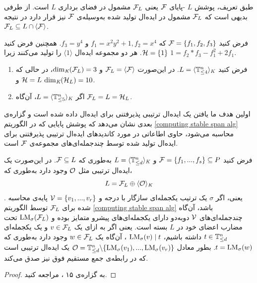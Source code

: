 \begin{corollary}
طبق تعریف، پوشش 
$L$
-پایای 
${\mathcal F}$
یعنی 
${\mathcal F}_{L}$
مشمول در فضای برداری 
$L$
است. از طرفی بدیهی است که 
${\mathcal F}_{L}$
مشمول در ایده‌ال تولید شده به‌وسیله‌ی 
${\mathcal F}$
نیز قرار دارد  در نتیجه 
${\mathcal F}_{L}\subseteq L\cap \langle {\mathcal F} \rangle$.
\end{corollary}

\begin{example}
فرض کنید 
${\mathcal F} = \{f_{1}, f_{2}, f_{3}\}$
که 
$f_{1} = x^{2}y^{2} + 1, f_{2} = x^{4}$
و
$f_{3} = y^{4}$.
همچنین فرض کنید 
${\mathcal H} = \{1\}$.
هر دو مجموعه‌ ایده‌ال 
$\langle 1\rangle$
را تولید می‌کنند زیرا 
$1 = f_{2}*f_{3} - f_{1}^{2} + 2f_{1}$.

\begin{enumerate}
\item
فرض کنید 
$L = \langle {\mathbb{T}}^{n}_{\leq 4}\rangle_{\textit{K}}$.
در این‌صورت 
${\mathcal F}_{L} = \langle {\mathcal F}\rangle$
و
$\dim_{\textit{K}}({\mathcal F}_{L}) = 3$،
در حالی که 
${\mathcal H} = L$
و 
$\dim_{\textit{K}}({\mathcal H}_{L}) = 10$.
\item
اگر 
$L = \langle {\mathbb{T}}^{n}_{\leq 5}\rangle_{\textit{K}}$،
آن‌گاه 
${\mathcal F}_{L} = L = {\mathcal H}_{L}$.
\end{enumerate}
\end{example}

اولین هدف ما یافتن یک ایده‌ال ترتیبی پذیرفتنی برای ایده‌ال داده شده است و گزاره‌ی بعدی نشان می‌دهد که پوشش پایایی که در الگوریتم 
\ref{computing stable span alg}
محاسبه می‌شود، حاوی اطاعاتی در مورد کاندید‌های ایده‌ال ترتیبی پذیرفتنی برای ایده‌ال تولید شده توسط چندجمله‌ای‌های  مجموعه‌ی 
${\mathcal F}$
است.

\begin{proposition}
فرض کنید 
${\mathcal F} = \{f_{1},...,f_{s}\}\subseteq P$
و
$L = \langle {\mathbb{T}}^{n}_{\leq d} \rangle_{\textit{K}}$
به‌طوری که 
${\mathcal F}\subseteq L$.
در این‌صورت یک ایده‌ال ترتیبی مثل 
${\mathcal O}$
وجود دارد به‌طوری که،
$$L = {\mathcal F}_{L}\oplus \langle {\mathcal O} \rangle_{\textit{K}}$$.
یعنی، اگر 
$\sigma$
یک ترتیب یکجمله‌ای سازگار با درجه  و 
${\mathcal V} = \{v_{1},...,v_{r}\}$
پایه‌ی محاسبه شده برای 
${\mathcal F}_{L}$
توسط الگوریتم 
\ref{computing stable span alg}
باشد، آن‌گاه چندجمله‌ای‌های 
${\mathcal V}$
دوبه‌دو دارای یکجمله‌ای‌های پیشرو متمایز بوده و 
$\operatorname{\mathrm{LM}}_{\sigma}({\mathcal F}_{L})$
تحت مضارب اعضای خود در 
$L$
بسته است. یعنی اگر به ازای یک 
$v\in {\mathcal F}_{L}$
و یک یکجمله‌ای 
$t\in {\mathbb{T}}^{n}_{\leq d}$
داشته باشیم، 
$\operatorname{\mathrm{LM}}_{\sigma}(v)\mid t$
، آن‌گاه یک 
$w\in {\mathcal F}_{L}$
وجود دارد به‌طوری که 
$t = \operatorname{\mathrm{LM}}_{\sigma}(w)$.
بطور معادل 
${\mathcal O} = {\mathbb{T}}^{n}_{\leq d}\backslash \{\operatorname{\mathrm{LM}}_{\sigma}(v_{1}),...,\operatorname{\mathrm{LM}}_{\sigma}(v_{r})\}$
یک ایده‌ال ترتیبی است که در رابطه‌ی جمع مستقیم فوق نیز صدق می‌کند. 
\end{proposition}
\begin{proof}
به گزاره‌ی ۱۵ 
{\small \cite{kehrein2006computing}}
، مراجعه کنید.
\end{proof}

